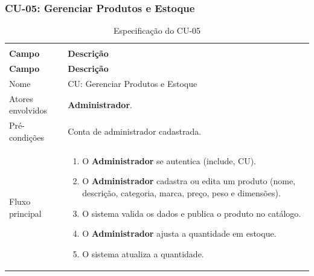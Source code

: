 \documentclass[12pt,a4paper]{article}
\begin{document}
\Needspace{200pt}
\subsubsection{CU-05: Gerenciar Produtos e Estoque}

{\setlength{\arrayrulewidth}{0.3pt}\renewcommand{\arraystretch}{1.1}\small{}
\begin{xltabular}{\textwidth}{>{\raggedright\arraybackslash}p{3.4cm}|>{\raggedright\arraybackslash}X}
\caption{Especificação do CU-05}\\
\toprule{}
\textbf{Campo} & \textbf{Descrição}\\ \midrule{}
\endfirsthead
{}\toprule{}
\textbf{Campo} & \textbf{Descrição}\\ \midrule{}
\endhead
\endlastfoot
Nome & CU: Gerenciar Produtos e Estoque\\ \hline
Atores envolvidos & \textbf{Administrador}.\\ \hline
Pré-condições & Conta de administrador cadastrada.\\ \hline
Fluxo principal & \begin{enumerate}[nosep,leftmargin=1.4em,label=\arabic*.,before=\vspace{-\baselineskip},after=\vspace{-0.4\baselineskip}]\item O \textbf{Administrador} se autentica (include, CU). \item O \textbf{Administrador} cadastra ou edita um produto (nome, descrição, categoria, marca, preço, peso e dimensões). \item O sistema valida os dados e publica o produto no catálogo. \item O \textbf{Administrador} ajusta a quantidade em estoque. \item O sistema atualiza a quantidade. \end{enumerate}\\ \hline

\end{xltabular}}
\end{document}
